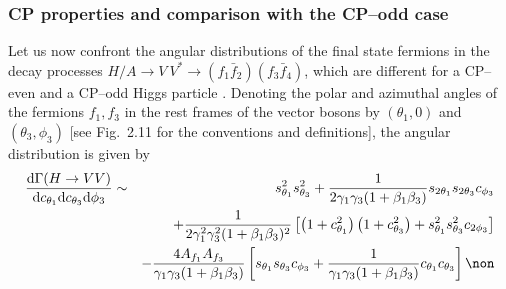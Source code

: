 \subsubsection{CP properties and comparison with the CP--odd case}

Let us now confront the angular distributions of the final state fermions in 
the decay processes $H/A \rightarrow  V \ V^* \rightarrow  (f_1 \bar{f}_2) (f_3 
\bar{f}_4)$, which are different for a CP--even and a CP--odd Higgs particle
\cite{CPHVVold,Bargeretal,CP-Gunion-GP,CPHVVchoi}. Denoting the polar and 
azimuthal angles of
the fermions $f_1,f_3$ in the rest frames of the vector bosons by $(\theta_1,0
)$ and $(\theta_3,\phi_3)$ [see Fig.~2.11 for the conventions and definitions], 
the angular  distribution is given by \cite{Bargeretal}
\begin{eqnarray}
\frac{ {\rm d}\Gamma (H \rightarrow  VV)} { {\rm d} c_{\theta_1} {\rm
d}c_{\theta_3}
{\rm d} \phi_3} &\sim & \ \ s^2_{\theta_1} s^2_{\theta_3} +\frac{1}{2 \gamma_1
\gamma_3(1+\beta_1 \beta_3)} s_{2 \theta_1} s_{2\theta_3} c_{\phi_3}
 \\
& &+{1\over2\gamma_1^2\gamma_3^2(1+\beta_1\beta_3)^2}
\left[\left(1+c_{\theta_1}^2\right)\left(1+c_{\theta_3}^2\right)
+s_{\theta_1}^2s_{\theta_3}^2c_{2\phi_3}\right]
\nonumber \\
& &-
\frac{4 A_{f_1} A_{f_3} }{\gamma_1\gamma_3(1+\beta_1 \beta_3)}
\left[ s_{\theta_1} s_{\theta_3} c_{\phi_3}
+\frac{1}{\gamma_1\gamma_3(1+\beta_1 \beta_3)}
c_{\theta_1}c_{\theta_3}\right] \non 
\label{HVV*distr}
\end{eqnarray}
\vspace*{-1.3cm}
